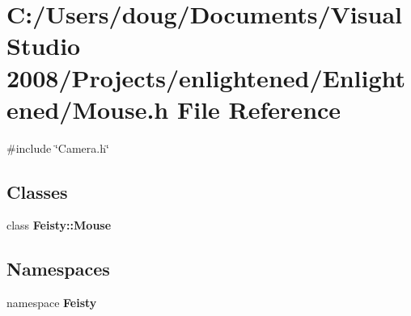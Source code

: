 \section{C:/Users/doug/Documents/Visual Studio 2008/Projects/enlightened/Enlightened/Mouse.h File Reference}
\label{_mouse_8h}
{\ttfamily \#include \char`\"{}Camera.h\char`\"{}}\par
\subsection*{Classes}
\begin{DoxyCompactItemize}
\item 
class {\bf Feisty::Mouse}
\end{DoxyCompactItemize}
\subsection*{Namespaces}
\begin{DoxyCompactItemize}
\item 
namespace {\bf Feisty}
\end{DoxyCompactItemize}
